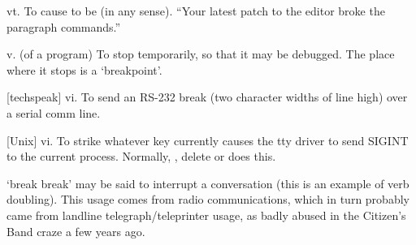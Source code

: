 
\begin{inparaenum}
\item vt. To cause to be  (in any sense). ``Your latest patch
    to the editor broke the paragraph commands.''
\item v. (of a program) To stop temporarily, so that it may be debugged. The
    place where it stops is a `breakpoint'.
\item {[}techspeak] vi. To send an RS-232 break (two character widths of line
    high) over a serial comm line.
\item {[}Unix] vi. To strike whatever key currently causes the tty driver to
    send SIGINT to the current process. Normally, , delete
    or  does this.
\item `break break' may be said to interrupt a conversation (this is an example
    of verb doubling). This usage comes from radio communications, which in turn
    probably came from landline telegraph/teleprinter usage, as badly abused in
    the Citizen's Band craze a few years ago.
\end{inparaenum}

